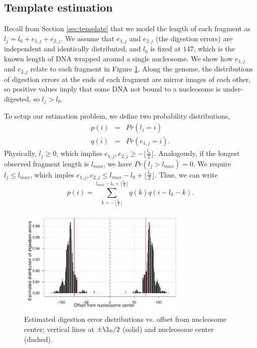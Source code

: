 \subsection{Template estimation}
\label{sec:templateEstimation}

Recall from Section \ref{sec:template} that we model the length of each fragment as $ l_j = l_0 + e_{1,j} + e_{2,j} $.
We assume that $e_{1,j}$ and $e_{2,j}$ (the digestion errors) are independent and identically distributed, and $l_0$ is fixed at $147$, which is the known length of DNA wrapped around a single nucleosome.
We show how $e_{1,j}$ and $e_{2,j}$ relate to each fragment in Figure \ref{fig:digestErrors}.
Along the genome, the distributions of digestion errors at the ends of each fragment are mirror images of each other, so positive values imply that some DNA not bound to a nucleosome is under-digested, so $l_j > l_0$.

To setup our estimation problem, we define two probability distributions,
\begin{eqnarray}
 p(i) &=& Pr \left( l_j = i \right) \\
 q(i) &=& Pr \left( e_{1,j} = i \right).
\end{eqnarray}
Physically, $l_j \geq0$, which implies $e_{1,j}, e_{2,j} \geq - \lfloor \frac{l_0}{2} \rfloor$. Analogously, if the longest observed fragment length is
$l_{max}$, we have  $Pr \left( l_j > l_{max} \right) = 0$. We require $l_j\leq l_{max}$, which imples $e_{1,j}, e_{2,j} \leq l_{max} - l_0 + \lfloor \frac{l_0}{2} \rfloor$. Thus, we can write 
\begin{equation}
 p(i) = \sum_{k=-\lfloor \frac{l_0}{2} \rfloor}^{l_{max} - l_0 + \lfloor
\frac{l_0}{2} \rfloor} q(k) q(i - l_0 - k).
\end{equation}

\ifx\nofigures\undefined
\begin{figure}
\centering
\includegraphics[width=0.75\textwidth]{figures/nucleosomes/plotDigestionDist_histogram}
\caption{Estimated digestion error distributions vs. offset from nucleosome
center; vertical lines at $\pm \l_0 / 2$ (solid) and nucleosome center (dashed).
\label{fig:digestErrors}}
\end{figure}
\fi

